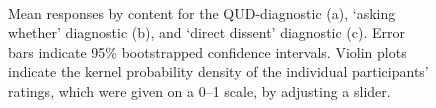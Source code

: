 \documentclass[11pt, a4paper]{article}
\begin{document}
\pagebreak
\begin{figure}[htbp]
  \vspace{-\baselineskip}
  \caption{Mean responses by content for the QUD-diagnostic (a), `asking whether' diagnostic (b), and `direct dissent' diagnostic (c). Error bars indicate 95\% bootstrapped confidence intervals. Violin plots indicate the kernel probability density of the individual participants’ ratings, which were given on a 0--1 scale, by adjusting a slider.} \label{fig:slider-ratings}

  \centering 
  \vspace{-.3\baselineskip}
    \\
    \vspace{-\baselineskip}

\end{figure}
\end{document}
